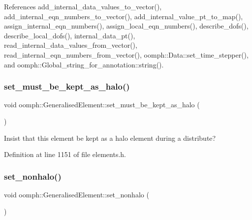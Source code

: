 References add\+\_\+internal\+\_\+data\+\_\+values\+\_\+to\+\_\+vector(), add\+\_\+internal\+\_\+eqn\+\_\+numbers\+\_\+to\+\_\+vector(), add\+\_\+internal\+\_\+value\+\_\+pt\+\_\+to\+\_\+map(), assign\+\_\+internal\+\_\+eqn\+\_\+numbers(), assign\+\_\+local\+\_\+eqn\+\_\+numbers(), describe\+\_\+dofs(), describe\+\_\+local\+\_\+dofs(), internal\+\_\+data\+\_\+pt(), read\+\_\+internal\+\_\+data\+\_\+values\+\_\+from\+\_\+vector(), read\+\_\+internal\+\_\+eqn\+\_\+numbers\+\_\+from\+\_\+vector(), oomph\+::\+Data\+::set\+\_\+time\+\_\+stepper(), and oomph\+::\+Global\+\_\+string\+\_\+for\+\_\+annotation\+::string().

\mbox{\label{classoomph_1_1GeneralisedElement_ab5902d0381f64162286885c984a01a17}} 
\subsubsection{\texorpdfstring{set\+\_\+must\+\_\+be\+\_\+kept\+\_\+as\+\_\+halo()}{set\_must\_be\_kept\_as\_halo()}}
{\footnotesize\ttfamily void oomph\+::\+Generalised\+Element\+::set\+\_\+must\+\_\+be\+\_\+kept\+\_\+as\+\_\+halo (\begin{DoxyParamCaption}{ }\end{DoxyParamCaption})\hspace{0.3cm}{\ttfamily [inline]}}



Insist that this element be kept as a halo element during a distribute? 



Definition at line 1151 of file elements.\+h.

\mbox{\label{classoomph_1_1GeneralisedElement_a0067cc08893086ab156cc13950e9943f}} 
\subsubsection{\texorpdfstring{set\+\_\+nonhalo()}{set\_nonhalo()}}
{\footnotesize\ttfamily void oomph\+::\+Generalised\+Element\+::set\+\_\+nonhalo (\begin{DoxyParamCaption}{ }\end{DoxyParamCaption})\hspace{0.3cm}{\ttfamily [inline]}}



